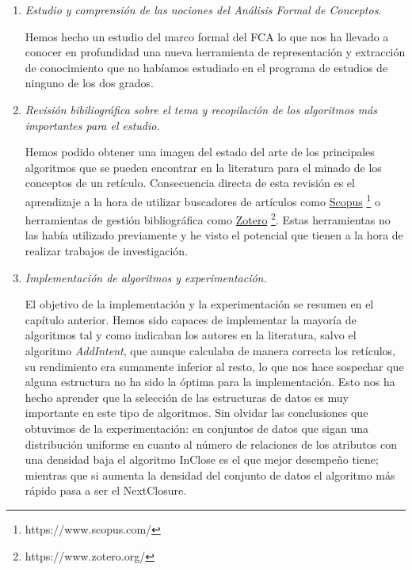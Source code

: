 \documentclass[oneside,openright,titlepage,numbers=noenddot,openany,headinclude,footinclude=true,
cleardoublepage=empty,abstractoff,BCOR=5mm,paper=a4,fontsize=12pt,main=spanish]{scrreprt}
\begin{document}
\begin{enumerate}
    \item \textit{Estudio y comprensión de las nociones del Análisis Formal de Conceptos}.
    
    Hemos hecho un estudio del marco formal del FCA lo que nos ha llevado a conocer en profundidad una nueva herramienta de representación y extracción de conocimiento que no habíamos estudiado en el programa de estudios de ninguno de los dos grados.\\
    
    \item \textit{Revisión bibiliográfica sobre el tema y recopilación de los algoritmos más importantes para el estudio.}
    
    Hemos podido obtener una imagen del estado del arte de los principales algoritmos que se pueden encontrar en la literatura para el minado de los conceptos de un retículo. Consecuencia directa de esta revisión es el aprendizaje a la hora de utilizar buscadores de artículos como \href{https://www.scopus.com/}{Scopus} \footnote{https://www.scopus.com/} o herramientas de gestión bibliográfica como \href{https://www.zotero.org/}{Zotero} \footnote{https://www.zotero.org/}. Estas herramientas no las había utilizado previamente y he visto el potencial que tienen a la hora de realizar trabajos de investigación.\\
    
    \item \textit{Implementación de algoritmos y experimentación.}
    
    El objetivo de la implementación y la experimentación se resumen en el capítulo anterior. Hemos sido capaces de implementar la mayoría de algoritmos tal y como indicaban los autores en la literatura, salvo el algoritmo \textit{AddIntent}, que aunque calculaba de manera correcta los retículos, su rendimiento era sumamente inferior al resto, lo que nos hace sospechar que alguna estructura no ha sido la óptima para la implementación. Esto nos ha hecho aprender que la selección de las estructuras de datos es muy importante en este tipo de algoritmos. Sin olvidar las conclusiones que obtuvimos de la experimentación: en conjuntos de datos que sigan una distribución uniforme en cuanto al número de relaciones de los atributos con una densidad baja el algoritmo InClose es el que mejor desempeño tiene; mientras que si aumenta la densidad del conjunto de datos el algoritmo más rápido pasa a ser el NextClosure.\\
    

\end{enumerate}
\end{document}
